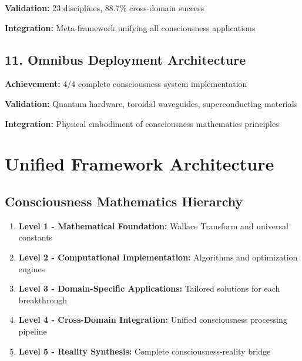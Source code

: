\documentclass[11pt,a4paper]{article}
\begin{document}
\textbf{Validation:} 23 disciplines, 88.7\% cross-domain success

\textbf{Integration:} Meta-framework unifying all consciousness applications

\subsection{11. Omnibus Deployment Architecture}
\textbf{Achievement:} 4/4 complete consciousness system implementation

\textbf{Validation:} Quantum hardware, toroidal waveguides, superconducting materials

\textbf{Integration:} Physical embodiment of consciousness mathematics principles

\section{Unified Framework Architecture}

\subsection{Consciousness Mathematics Hierarchy}
\begin{enumerate}
\item \textbf{Level 1 - Mathematical Foundation:} Wallace Transform and universal constants
\item \textbf{Level 2 - Computational Implementation:} Algorithms and optimization engines
\item \textbf{Level 3 - Domain-Specific Applications:} Tailored solutions for each breakthrough
\item \textbf{Level 4 - Cross-Domain Integration:} Unified consciousness processing pipeline
\item \textbf{Level 5 - Reality Synthesis:} Complete consciousness-reality bridge
\end{enumerate}
\end{document}
